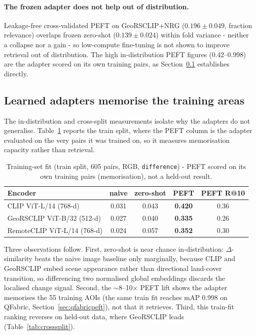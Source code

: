 \documentclass{article}
\begin{document}
\paragraph{The frozen adapter does not help out of distribution.}
Leakage-free cross-validated PEFT on GeoRSCLIP+NRG ($0.196 \pm 0.049$, fraction
relevance) overlaps frozen zero-shot ($0.139 \pm 0.024$) within fold variance -
neither a collapse nor a gain - so low-compute fine-tuning is not shown to
improve retrieval out of distribution. The high in-distribution PEFT figures
(0.42--0.998) are the adapter scored on its own training pairs, as
Section~\ref{sec:memorisation} establishes directly.

\subsection{Learned adapters memorise the training areas}
\label{sec:memorisation}

The in-distribution and cross-split measurements isolate why the adapters do not
generalise. Table~\ref{tab:indist} reports the train split, where the PEFT column
is the adapter evaluated on the very pairs it was trained on, so it measures
memorisation capacity rather than retrieval.

\begin{table}[H]
    \centering
    \caption{Training-set fit (train split, 605 pairs, RGB, \texttt{difference}) -
    PEFT scored on its own training pairs (memorisation), not a held-out result.}
    \label{tab:indist}
    \begin{tabular}{lcccc}
        \toprule
        \textbf{Encoder} & \textbf{naive} & \textbf{zero-shot} & \textbf{PEFT} & \textbf{PEFT R@10} \\
        \midrule
        CLIP ViT-L/14 (768-d)       & 0.031 & 0.043 & \textbf{0.420} & 0.36 \\
        GeoRSCLIP ViT-B/32 (512-d)  & 0.027 & 0.040 & \textbf{0.335} & 0.26 \\
        RemoteCLIP ViT-L/14 (768-d) & 0.024 & 0.057 & \textbf{0.352} & 0.30 \\
        \bottomrule
    \end{tabular}
\end{table}

Three observations follow. First, zero-shot is near chance in-distribution:
$\Delta$-similarity beats the naive image baseline only marginally, because CLIP
and GeoRSCLIP embed scene appearance rather than directional land-cover
transition, so differencing two normalised global embeddings discards the
localised change signal. Second, the $\sim$8--10$\times$ PEFT lift shows the
adapter memorises the 55 training AOIs (the same train fit reaches mAP 0.998 on
QFabric, Section~\ref{sec:qfabricpeft}), not that it retrieves. Third, this
train-fit ranking reverses on held-out data, where GeoRSCLIP leads
(Table~\ref{tab:crosssplit}).
\end{document}
